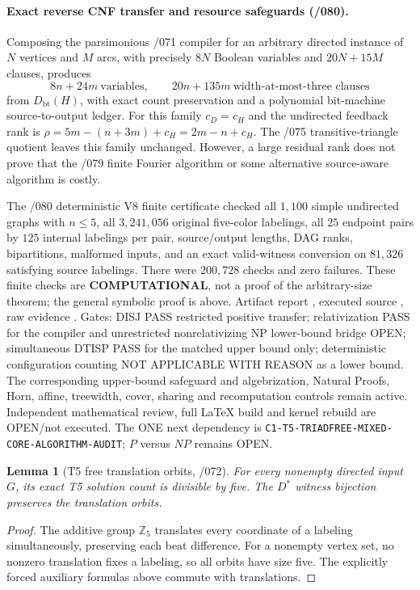 \documentclass[11pt]{article}
\newtheorem{lemma}{Lemma}
\begin{document}
\paragraph{Exact reverse CNF transfer and resource safeguards (/080).}
Composing the parsimonious /071 compiler
for an arbitrary directed instance of $N$ vertices and $M$
arcs, with precisely $8N$ Boolean variables and
$20N+15M$ clauses, produces
\[
 8n+24m\ \text{variables},\qquad
 20n+135m\ \text{width-at-most-three clauses}
\]
from $D_{\mathrm{bt}}(H)$, with exact count preservation
and a polynomial bit-machine source-to-output ledger.
For this family $c_D=c_H$ and the undirected feedback rank is
$\rho=5m-(n+3m)+c_H=2m-n+c_H$.
The /075 transitive-triangle quotient leaves this
family unchanged.  However, a large residual rank does not
prove that the /079 finite Fourier algorithm or some
alternative source-aware algorithm is costly.

The /080 deterministic V8 finite certificate checked
all $1{,}100$ simple undirected graphs with $n\le5$,
all $3{,}241{,}056$ original five-color labelings,
all $25$ endpoint pairs by $125$ internal
labelings per pair, source/output lengths, DAG ranks,
bipartitions, malformed inputs, and an exact valid-witness
conversion on $81{,}326$ satisfying source labelings.
There were $200{,}728$ checks and zero failures.
These finite checks are \textbf{COMPUTATIONAL},
not a proof of the arbitrary-size theorem; the general
symbolic proof is above.  Artifact report
,
executed source
,
raw evidence
.
Gates: DISJ PASS restricted positive transfer; relativization
PASS for the compiler and unrestricted nonrelativizing
NP lower-bound bridge OPEN; simultaneous DTISP PASS
for the matched upper bound only; deterministic configuration
counting NOT APPLICABLE WITH REASON as a lower bound.
The corresponding upper-bound safeguard and algebrization,
Natural Proofs, Horn, affine, treewidth, cover, sharing and
recomputation controls remain active.  Independent mathematical
review, full LaTeX build and kernel rebuild are OPEN/not executed.
The ONE next dependency is
\texttt{C1-T5-TRIADFREE-MIXED-CORE-ALGORITHM-AUDIT};
$P$ versus $NP$ remains OPEN.

\begin{lemma}[T5 free translation orbits, /072]
For every nonempty directed input $G$, its exact T5 solution count
is divisible by five. The $D^*$ witness bijection preserves the
translation orbits.
\end{lemma}
\begin{proof}
The additive group $\mathbb Z_5$ translates every coordinate of a
labeling simultaneously, preserving each beat difference.
For a nonempty vertex set, no nonzero translation fixes a labeling,
so all orbits have size five. The explicitly forced auxiliary
formulas above commute with translations.
\end{proof}
\end{document}
